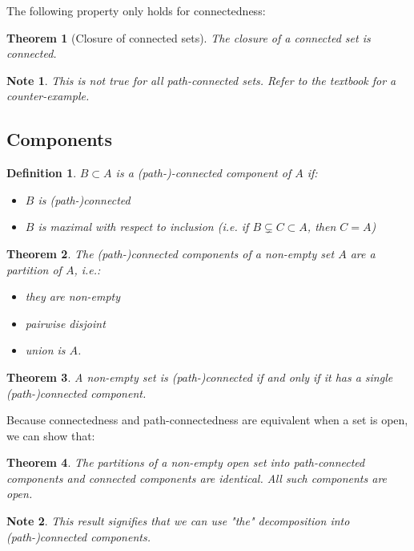 \documentclass{article}
\newtheorem*{defi}{Definition}
\newtheorem*{note}{Note}
\newtheorem*{thm*}{Theorem}
\begin{document}
The following property only holds for connectedness:
\begin{thm*}[Closure of connected sets]
    The closure of a connected set is connected.
\end{thm*}

\begin{note}
    This is \emph{not} true for all path-connected sets. Refer to the textbook for a counter-example.
\end{note}

\subsection{Components}
\begin{defi}
    $B\subset A$ is a (path-)-connected component of $A$ if:

    \begin{itemize}
        \item $B$ is (path-)connected
        \item $B$ is maximal with respect to inclusion (i.e. if $B\subsetneq C\subset A$, then $C=A$)
    \end{itemize}
\end{defi}

\begin{thm*}
    The (path-)connected components of a non-empty set $A$ are a partition of $A$, i.e.:
    \begin{itemize}
        \item they are non-empty
        \item pairwise disjoint 
        \item union is $A$.
    \end{itemize}
\end{thm*}

\begin{thm*}
    A non-empty set is (path-)connected if and only if it has a single (path-)connected component.
\end{thm*}

Because connectedness and path-connectedness are equivalent when a set is open, we can show that:

\begin{thm*}
    The partitions of a non-empty open set into path-connected components and connected components are identical. All such components are open.
\end{thm*}

\begin{note}
    This result signifies that we can use "the" decomposition into (path-)connected components.
\end{note}
\end{document}
